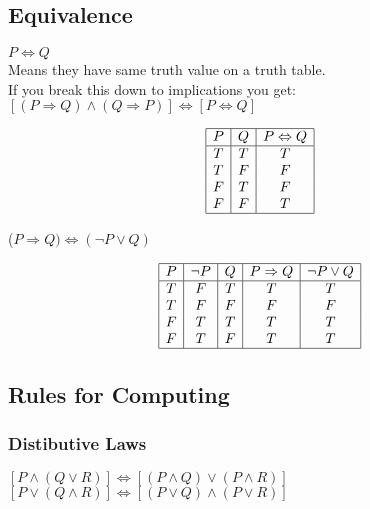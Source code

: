 \documentclass[11pt]{scrartcl}
\begin{document}
\subsection{Equivalence}
$P \Leftrightarrow Q$	
\\
Means they have same truth value on a truth table.
\\
If you break this down to implications you get:
\\
$[(P \Rightarrow Q) \land (Q \Rightarrow P)] \Leftrightarrow [P \Leftrightarrow Q]$
\begin{center}
	\begin{displaymath}
		\begin{array}{|c|c|c|}
			\hline
			P & Q & P \Leftrightarrow Q \\ 
			\hline
			T & T & T\\
			T & F & F\\
			F & T & F\\
			F & F & T\\
			\hline
		\end{array}
	\end{displaymath}
\end{center}


($P \Rightarrow Q) \Leftrightarrow (\lnot P \lor Q)$ 
\begin{center}
	\begin{displaymath}
		\begin{array}{|c|c|c|c|c|}
			\hline
			P & \lnot P & Q & P \Rightarrow Q & \lnot P \lor Q\\ 
			\hline
			T & F & T & T & T\\
			T & F & F & F & F\\
			F & T & T & T & T\\
			F & T & F & T & T\\
			\hline
		\end{array}
	\end{displaymath}
\end{center}

\subsection{Rules for Computing}

\subsubsection{Distibutive Laws}
$[P \land (Q \lor R)]\Leftrightarrow[(P \land Q) \lor (P \land R)]$\\
$[P \lor (Q \land R)]\Leftrightarrow[(P \lor Q) \land (P \lor R)]$
\end{document}
